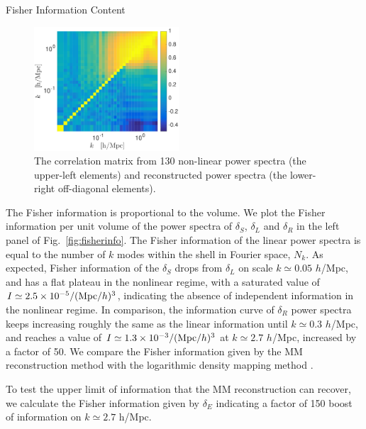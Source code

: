 \begin{section}{Fisher Information Content}
  \begin{figure}
    \centering
    \includegraphics[width=0.48\textwidth]{fig3.pdf}
    \caption{The correlation matrix from 130 non-linear power
      spectra (the upper-left elements) and reconstructed power
      spectra (the lower-right off-diagonal elements).}
    \label{fig:corrall}
  \end{figure}

  The Fisher information is proportional to the volume. 
  We plot the Fisher information per unit volume of the power spectra of
  $\delta_S$, $\delta_L$ and $\delta_R$ in the left panel of 
  Fig.~\ref{fig:fisherinfo}. The Fisher information of the linear 
  power spectra is equal to the number of $k$ modes within the shell in 
  Fourier space, $N_k$. As expected, Fisher information of the
  $\delta_S$ drops from $\delta_L$ on scale
  $k \simeq 0.05$ $h$/Mpc, and has a flat plateau in the nonlinear
  regime, with a saturated value of
  $I \simeq 2.5 \times 10^{-5}/({\rm Mpc}/h)^3$, indicating
  the absence of independent information in the nonlinear
  regime.  In comparison, the information curve of $\delta_R$ power
  spectra keeps increasing roughly the same as the linear information
  until $k\simeq 0.3$ $h$/Mpc, and reaches a value of 
  $I \simeq 1.3 \times 10^{-3}/({\rm Mpc}/h)^3$ at $k \simeq 2.7$ $h$/Mpc,
  increased by a factor of 50.
  We compare the Fisher information given by the MM reconstruction method
  with the logarithmic density mapping method \cite{bib:Mark2009}.
  
  To test the upper limit of information that the MM reconstruction can recover, 
  we calculate the Fisher information given by $\delta_E$ \cite{bib:Yu2016} indicating
  a factor of 150 boost of information on 
  $k \simeq 2.7$ h/Mpc.


\end{section}
